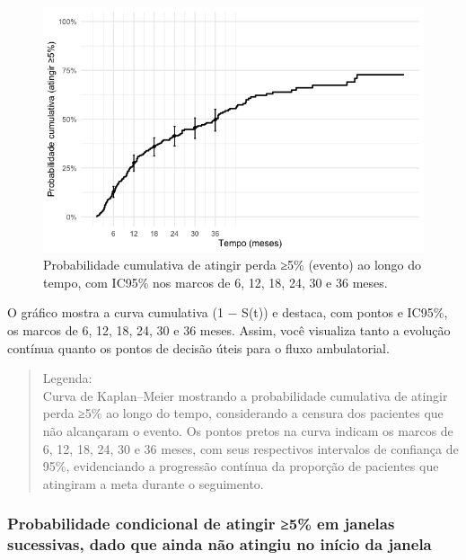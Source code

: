 \documentclass[
]{article}
\begin{document}
\begin{figure}[H]

{\centering \includegraphics[width=1\textwidth,height=\textheight]{outputs/figs/plot-cuminc-atingir-5-varias-janelas-1.png}

}

\caption{Probabilidade cumulativa de atingir perda ≥5\% (evento) ao
longo do tempo, com IC95\% nos marcos de 6, 12, 18, 24, 30 e 36 meses.}

\end{figure}%

O gráfico mostra a curva cumulativa (1 − S(t)) e destaca, com pontos e
IC95\%, os marcos de 6, 12, 18, 24, 30 e 36 meses. Assim, você visualiza
tanto a evolução contínua quanto os pontos de decisão úteis para o fluxo
ambulatorial.

\begin{quote}
Legenda:\\
Curva de Kaplan--Meier mostrando a probabilidade cumulativa de atingir
perda ≥5\% ao longo do tempo, considerando a censura dos pacientes que
não alcançaram o evento. Os pontos pretos na curva indicam os marcos de
6, 12, 18, 24, 30 e 36 meses, com seus respectivos intervalos de
confiança de 95\%, evidenciando a progressão contínua da proporção de
pacientes que atingiram a meta durante o seguimento.
\end{quote}

\subsubsection{Probabilidade condicional de atingir ≥5\% em janelas
sucessivas, dado que ainda não atingiu no início da
janela}\label{probabilidade-condicional-de-atingir-5-em-janelas-sucessivas-dado-que-ainda-nuxe3o-atingiu-no-inuxedcio-da-janela}
\end{document}
